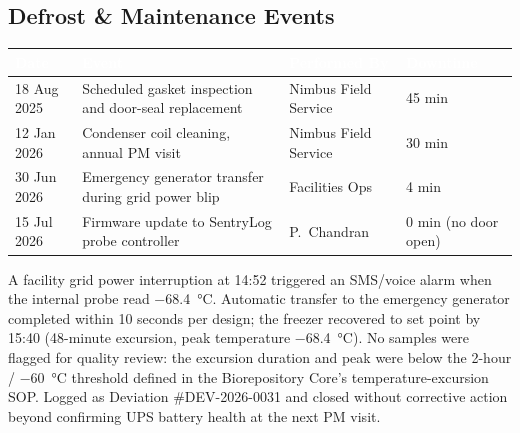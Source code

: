 \subsection{Defrost \& Maintenance Events}

\begin{center}
\renewcommand{\arraystretch}{1.2}
\small
\begin{tabularx}{0.92\linewidth}{@{}l X l l@{}}
\rowcolor{freezerblue}
\textcolor{white}{\textbf{Date}} & \textcolor{white}{\textbf{Event}} & \textcolor{white}{\textbf{Performed By}} & \textcolor{white}{\textbf{Downtime}} \\
\midrule
18 Aug 2025 & Scheduled gasket inspection and door-seal replacement & Nimbus Field Service & 45 min \\
12 Jan 2026 & Condenser coil cleaning, annual PM visit & Nimbus Field Service & 30 min \\
30 Jun 2026 & Emergency generator transfer during grid power blip & Facilities Ops & 4 min \\
15 Jul 2026 & Firmware update to SentryLog probe controller & P.\ Chandran & 0 min (no door open) \\
\bottomrule
\end{tabularx}
\end{center}

\vspace{0.4em}
\begin{tcolorbox}[enhanced,colback=alertamberL,colframe=alertamber,boxrule=0.8pt,arc=2pt,
  left=8pt,right=8pt,top=6pt,bottom=6pt,title={\faExclamationTriangle\ Temperature Excursion Incident -- 30 Jun 2026},
  coltitle=white,colbacktitle=alertamber,fonttitle=\bfseries\small]
\small
A facility grid power interruption at 14:52 triggered an SMS/voice alarm when the internal
probe read \SI{-68.4}{\celsius}. Automatic transfer to the emergency generator completed within
10 seconds per design; the freezer recovered to set point by 15:40 (48-minute excursion, peak
temperature \SI{-68.4}{\celsius}). No samples were flagged for quality review: the excursion
duration and peak were below the 2-hour / \SI{-60}{\celsius} threshold defined in the
Biorepository Core's temperature-excursion SOP. Logged as Deviation \#DEV-2026-0031 and closed
without corrective action beyond confirming UPS battery health at the next PM visit.
\end{tcolorbox}
